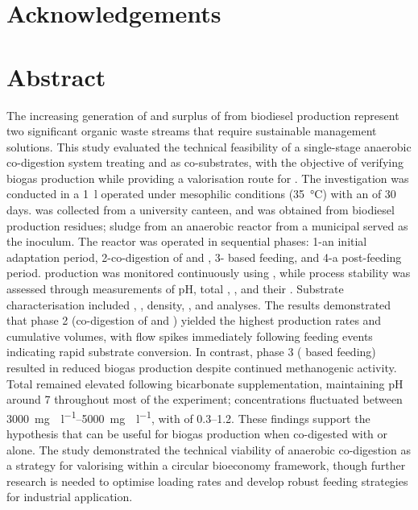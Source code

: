 \documentclass[12pt, a4paper, oneside]{report}
\begin{document}
\glstocfalse
\printunsrtglossary[type=abbreviations, title={List of Abbreviations}]
\glstoctrue

\glsresetall

\clearpage{}\chapter*{Acknowledgements}
\label{ch:acknowledgements}
\clearpage{}
\clearpage{}\chapter*{Abstract}
\label{ch:abstract}

The increasing generation of  and surplus of  from biodiesel production represent two significant organic waste streams that require sustainable management solutions. This study evaluated the technical feasibility of a single-stage anaerobic co-digestion system treating  and  as co-substrates, with the objective of verifying biogas production while providing a valorisation route for . The investigation was conducted in a \qty{1}{\litre}  operated under mesophilic conditions (\qty{35}{\celsius}) with an  of \num{30} days.  was collected from a university canteen, and  was obtained from biodiesel production residues; sludge from an anaerobic reactor from a municipal  served as the inoculum. The reactor was operated in sequential phases: 1-an initial adaptation period, 2-co-digestion of  and , 3- based feeding, and 4-a post-feeding period.  production was monitored continuously using , while process stability was assessed through measurements of pH, total , , and their . Substrate characterisation included , , density, , and  analyses. The results demonstrated that phase 2 (co-digestion of  and ) yielded the highest  production rates and cumulative volumes, with flow spikes immediately following feeding events indicating rapid substrate conversion. In contrast, phase 3 ( based feeding) resulted in reduced biogas production despite continued methanogenic activity. Total  remained elevated following bicarbonate supplementation, maintaining pH around \num{7} throughout most of the experiment;  concentrations fluctuated between \qtyrange{3000}{5000}{\milli\gram\CHCOOH\per\litre}, with  of \numrange{0.3}{1.2}. These findings support the hypothesis that  can be useful for biogas production when co-digested with  or alone. The study demonstrated the technical viability of anaerobic co-digestion as a strategy for valorising  within a circular bioeconomy framework, though further research is needed to optimise  loading rates and develop robust feeding strategies for industrial application.
\end{document}
